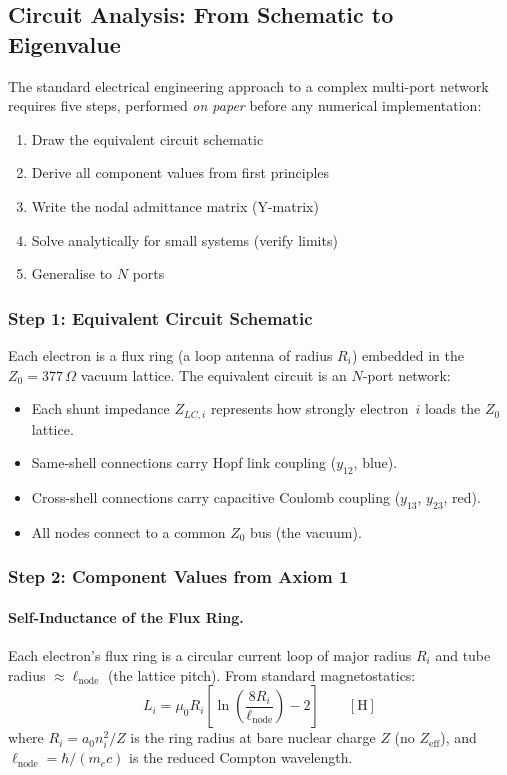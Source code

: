 \subsection{Circuit Analysis: From Schematic to Eigenvalue}
\label{sec:circuit_analysis}

The standard electrical engineering approach to a complex multi-port
network requires five steps, performed \emph{on paper} before any
numerical implementation:
\begin{enumerate}
    \item Draw the equivalent circuit schematic
    \item Derive all component values from first principles
    \item Write the nodal admittance matrix (Y-matrix)
    \item Solve analytically for small systems (verify limits)
    \item Generalise to $N$ ports
\end{enumerate}

\subsubsection{Step 1: Equivalent Circuit Schematic}

Each electron is a flux ring (a loop antenna of radius $R_i$)
embedded in the $Z_0 = 377\,\Omega$ vacuum lattice.
The equivalent circuit is an $N$-port network:
\begin{itemize}
    \item Each shunt impedance $Z_{LC,i}$ represents how strongly
          electron~$i$ loads the $Z_0$ lattice.
    \item Same-shell connections carry Hopf link coupling ($y_{12}$, blue).
    \item Cross-shell connections carry capacitive Coulomb coupling
          ($y_{13}$, $y_{23}$, red).
    \item All nodes connect to a common $Z_0$ bus (the vacuum).
\end{itemize}

\subsubsection{Step 2: Component Values from Axiom 1}

\paragraph{Self-Inductance of the Flux Ring.}
Each electron's flux ring is a circular current loop of major
radius $R_i$ and tube radius $\approx \ell_{\text{node}}$
(the lattice pitch). From standard magnetostatics:
\begin{equation}
    L_i = \mu_0 R_i \left[\ln\!\left(\frac{8R_i}
    {\ell_{\text{node}}}\right) - 2\right]
    \qquad [\text{H}]
    \label{eq:ring_inductance}
\end{equation}
where $R_i = a_0 n_i^2 / Z$ is the ring radius at bare nuclear
charge $Z$ (no $Z_{\text{eff}}$), and $\ell_{\text{node}} = \hbar/(m_e c)$
is the reduced Compton wavelength.

